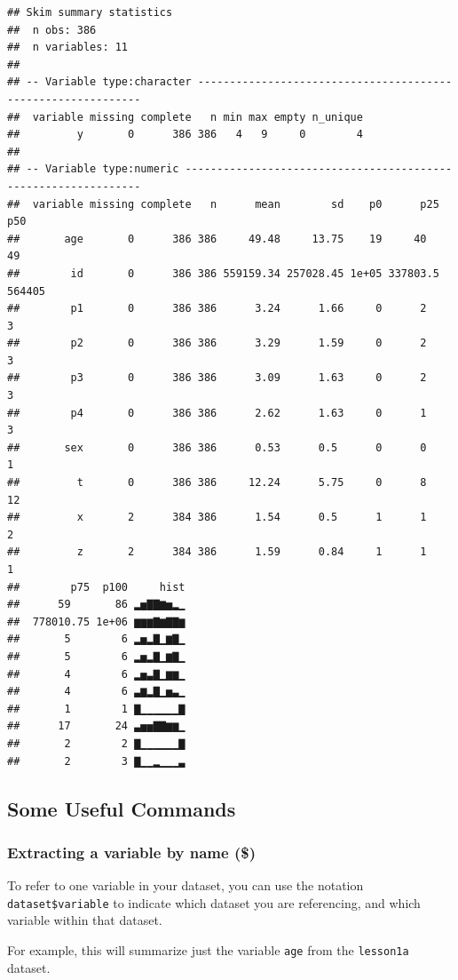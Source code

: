 \documentclass[]{book}
\begin{document}
\begin{verbatim}
## Skim summary statistics
##  n obs: 386 
##  n variables: 11 
## 
## -- Variable type:character -------------------------------------------------------------
##  variable missing complete   n min max empty n_unique
##         y       0      386 386   4   9     0        4
## 
## -- Variable type:numeric ---------------------------------------------------------------
##  variable missing complete   n      mean        sd    p0      p25    p50
##       age       0      386 386     49.48     13.75    19     40       49
##        id       0      386 386 559159.34 257028.45 1e+05 337803.5 564405
##        p1       0      386 386      3.24      1.66     0      2        3
##        p2       0      386 386      3.29      1.59     0      2        3
##        p3       0      386 386      3.09      1.63     0      2        3
##        p4       0      386 386      2.62      1.63     0      1        3
##       sex       0      386 386      0.53      0.5      0      0        1
##         t       0      386 386     12.24      5.75     0      8       12
##         x       2      384 386      1.54      0.5      1      1        2
##         z       2      384 386      1.59      0.84     1      1        1
##        p75  p100     hist
##      59       86 ▂▅▇▇▆▅▂▁
##  778010.75 1e+06 ▆▆▆▇▆▇▇▆
##       5        6 ▂▅▂▇▁▆▇▁
##       5        6 ▂▅▂▇▁▆▇▁
##       4        6 ▂▅▃▇▁▆▆▁
##       4        6 ▃▆▂▇▁▅▃▁
##       1        1 ▇▁▁▁▁▁▁▇
##      17       24 ▃▅▅▇▇▆▆▁
##       2        2 ▇▁▁▁▁▁▁▇
##       2        3 ▇▁▁▂▁▁▁▃
\end{verbatim}

\hypertarget{some-useful-commands}{%
\subsection{Some Useful Commands}\label{some-useful-commands}}

\hypertarget{extracting-a-variable-by-name}{%
\subsubsection{Extracting a variable by name
(\$)}\label{extracting-a-variable-by-name}}

To refer to one variable in your dataset, you can use the notation
\texttt{dataset\$variable} to indicate which dataset you are
referencing, and which variable within that dataset.

For example, this will summarize just the variable \texttt{age} from the
\texttt{lesson1a} dataset.
\end{document}
